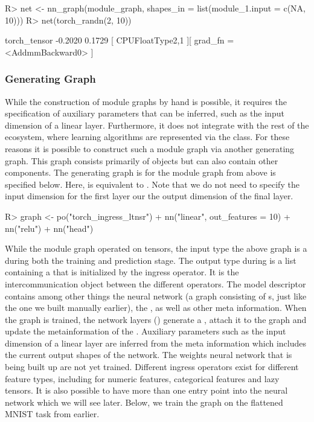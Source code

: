 \documentclass[article]{jss}
\theoremstyle{definition}
\begin{document}
\begin{CodeInput}
R> net <- nn_graph(module_graph, shapes_in = list(module_1.input = c(NA, 10)))
R> net(torch_randn(2, 10))
\end{CodeInput}
\begin{CodeOutput}
torch_tensor
-0.2020
 0.1729
[ CPUFloatType{2,1} ][ grad_fn = <AddmmBackward0> ]
\end{CodeOutput}

\subsubsection{Generating Graph}

While the construction of module graphs by hand is possible, it requires the specification of auxiliary parameters that can be inferred, such as the input dimension of a linear layer.
Furthermore, it does not integrate with the rest of the  ecosystem, where learning algorithms are represented via the  class.
For these reasons it is possible to construct such a module graph via another generating graph.
This graph consists primarily of  objects but can also contain other components.
The generating graph is for the module graph from above is specified below.
Here,  is equivalent to .
Note that we do not need to specify the input dimension for the first layer our the output dimension of the final layer.

\begin{CodeInput}
R> graph <- po("torch_ingress_ltnsr") %
+    nn("linear", out_features = 10) %
+    nn("relu") %
+    nn("head")
\end{CodeInput}

While the module graph operated on tensors, the input type the above graph is a  during both the training and prediction stage.
The output type during  is a list containing a  that is initialized by the ingress operator.
It is the intercommunication object between the different  operators.
The model descriptor contains among other things the neural network (a graph consisting of s, just like the one we built manually earlier), the , as well as other meta information.
When the graph is trained, the network layers () generate a , attach it to the graph and update the metainformation of the .
Auxiliary parameters such as the input dimension of a linear layer are inferred from the meta information which includes the current output shapes of the network.
The weights neural network that is being built up are not yet trained.
Different ingress operators exist for different feature types, including for numeric features, categorical features and lazy tensors.
It is also possible to have more than one entry point into the neural network which we will see later.
Below, we train the graph on the flattened MNIST task from earlier.
\end{document}
